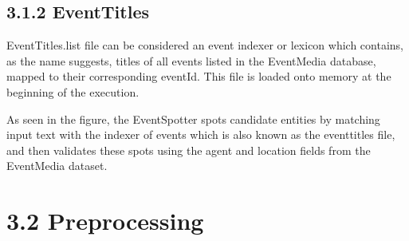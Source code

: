 \documentclass[a4paper,11pt]{report}
\begin{document}

\subsection*{3.1.2 EventTitles}
EventTitles.list file can be considered an event indexer or lexicon which contains, as the name suggests, titles of all events listed in the EventMedia database, mapped to their corresponding eventId. This file is loaded onto memory at the beginning of the execution.

As seen in the figure, the EventSpotter spots candidate entities by matching input text with the indexer of events which is also known as the eventtitles file, and then validates these spots using the agent and location fields from the EventMedia dataset.

\section*{3.2 Preprocessing}
\end{document}
